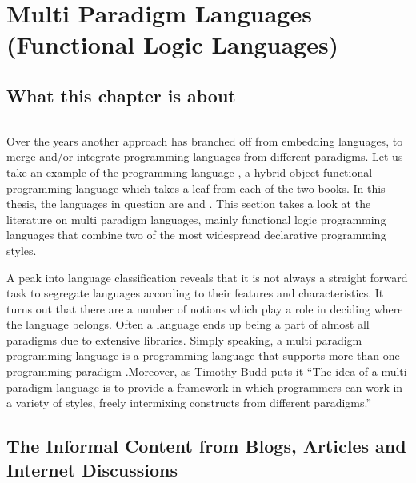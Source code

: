 \documentclass[thesis-solanki.tex]{subfiles}
\begin{document}
\chapter{Multi Paradigm Languages (Functional Logic Languages)}\label{chap:multiparadigm}


\section{What this chapter is about}

\noindent\rule{\textwidth}{0.5pt}


Over the years another approach has branched off from embedding languages, to merge and/or integrate programming
languages from different paradigms.
Let us take an example of the  programming language \cite{website:scala}, a hybrid
object-functional programming language which takes a leaf from each of the two books.
In this thesis, the languages in question are  and .
This section takes a look at the literature on multi paradigm languages, mainly functional logic programming
languages that combine two of the most widespread declarative programming styles.

A peak into language classification reveals that it is not always a straight forward task to segregate languages
according to their features and characteristics.
It turns out that there are a number of notions which play a role in deciding where the language
belongs. 
Often a language ends up being a part of almost all paradigms due to extensive libraries.
Simply speaking, a multi paradigm programming language is a programming language that supports more than one
programming paradigm \cite{Krishnamurthi:2008:TPL:1480828.1480846}.Moreover, as Timothy Budd puts it
\cite{website:wikimultiparadigm} ``The idea of a multi paradigm language is to provide a framework in
which programmers can work in a variety of styles, freely intermixing constructs from different
paradigms.''


\section{The Informal Content from Blogs, Articles and Internet Discussions}
  
\end{document}
